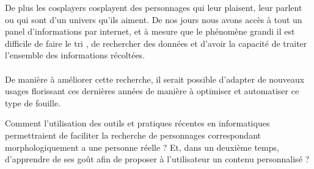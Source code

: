 \documentclass[a4paper,12pt]{article}
\begin{document}
De plus les cosplayers cosplayent des personnages qui leur plaisent, leur parlent ou qui sont d'un univers qu'ils aiment. De nos jours nous avons accès à tout un panel d'informations par internet, et à mesure que le phénomène grandi il est difficile de faire le tri , de rechercher des données et d'avoir la capacité de traiter l'ensemble des informations récoltées.  
\\ \\ 
De manière à améliorer cette recherche, il serait possible d'adapter de nouveaux usages florissant ces dernières années de manière à optimiser et automatiser ce type de fouille.

Comment l'utilisation des outils et pratiques récentes en informatiques permettraient de faciliter la recherche de personnages correspondant morphologiquement a une personne réelle ? Et, dans un deuxième temps, d'apprendre de ses goût afin de proposer à l'utilisateur un contenu personnalisé ?
\end{document}
